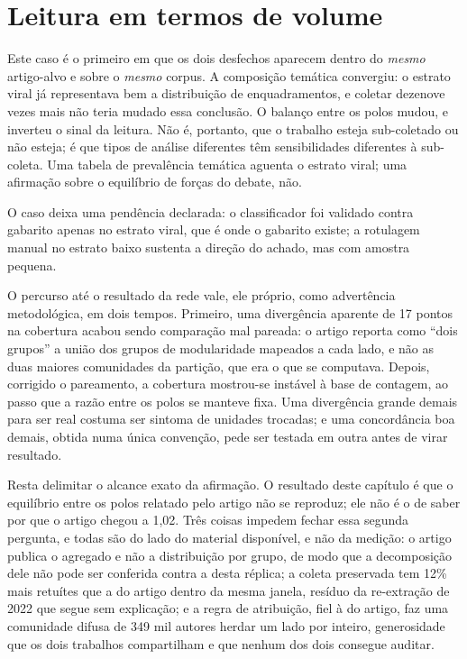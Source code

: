 \section{Leitura em termos de volume}

Este caso é o primeiro em que os dois desfechos aparecem dentro do \emph{mesmo}
artigo-alvo e sobre o \emph{mesmo} corpus. A composição temática convergiu: o
estrato viral já representava bem a distribuição de enquadramentos, e coletar
dezenove vezes mais não teria mudado essa conclusão. O balanço entre os polos
mudou, e inverteu o sinal da leitura. Não é, portanto, que o trabalho esteja
sub-coletado ou não esteja; é que tipos de análise diferentes têm sensibilidades
diferentes à sub-coleta. Uma tabela de prevalência temática aguenta o estrato
viral; uma afirmação sobre o equilíbrio de forças do debate, não.

O caso deixa uma pendência declarada: o classificador foi validado contra gabarito
apenas no estrato viral, que é onde o gabarito existe; a rotulagem manual no estrato
baixo sustenta a direção do achado, mas com amostra pequena.

O percurso até o resultado da rede vale, ele próprio, como advertência metodológica,
em dois tempos. Primeiro, uma divergência aparente de 17 pontos na cobertura acabou
sendo comparação mal pareada: o artigo reporta como ``dois grupos'' a união dos
grupos de modularidade mapeados a cada lado, e não as duas maiores comunidades da
partição, que era o que se computava. Depois, corrigido o pareamento, a cobertura
mostrou-se instável à base de contagem, ao passo que a razão entre os polos se
manteve fixa. Uma divergência grande demais para ser real costuma ser sintoma de
unidades trocadas; e uma concordância boa demais, obtida numa única convenção, pede
ser testada em outra antes de virar resultado.

Resta delimitar o alcance exato da afirmação. O resultado deste capítulo
é que o equilíbrio entre os polos relatado pelo artigo não se reproduz; ele não é o
de saber por que o artigo chegou a 1,02. Três coisas impedem fechar essa segunda
pergunta, e todas são do lado do material disponível, e não da medição: o artigo
publica o agregado e não a distribuição por grupo, de modo que a decomposição dele
não pode ser conferida contra a desta réplica; a coleta preservada tem 12\% mais
retuítes que a do artigo dentro da mesma janela, resíduo da re-extração de 2022 que
segue sem explicação; e a regra de atribuição, fiel à do artigo, faz uma comunidade
difusa de 349 mil autores herdar um lado por inteiro, generosidade que os dois
trabalhos compartilham e que nenhum dos dois consegue auditar.

